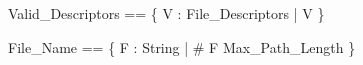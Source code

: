 \pagestyle{empty}

\begin{zed}
Valid\_Descriptors == \{ V : File\_Descriptors | V  \}
\end{zed}
\begin{zed}
File\_Name == \{ F : String | \# F \leq Max\_Path\_Length \}
\end{zed}

